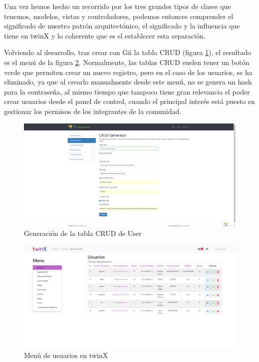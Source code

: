 Una vez hemos hecho un recorrido por los tres grandes tipos de clases que tenemos, modelos, vistas y controladores, podemos entonces comprender el significado de nuestro patrón arquitectónico, el significado y la influencia que tiene en twinX y lo coherente que es el establecer esta separación.

Volviendo al desarrollo, tras crear con Gii la tabla CRUD (figura \ref{fig:giicruduser}), el resultado es el menú de la figura \ref{fig:usuariostwinX}. Normalmente, las tablas CRUD suelen tener un botón verde que permiten crear un nuevo registro, pero en el caso de los usuarios, se ha eliminado, ya que al crearlo manualmente desde este menú, no se genera un hash para la contraseña, al mismo tiempo que tampoco tiene gran relevancia el poder crear usuarios desde el panel de control, cuando el principal interés está puesto en gestionar los permisos de los integrantes de la comunidad.

\begin{figure}
	\centering
	\includegraphics[width=\textwidth]{Capturas de twinX/gii_crud_user}
	\caption{Generación de la tabla CRUD de User}
	\label{fig:giicruduser}
\end{figure}


\begin{figure}
	\centering
	\includegraphics[width=\textwidth]{Capturas de twinX/usuarios_twinX}
	\caption{Menú de usuarios en twinX}
	\label{fig:usuariostwinX}
\end{figure}


